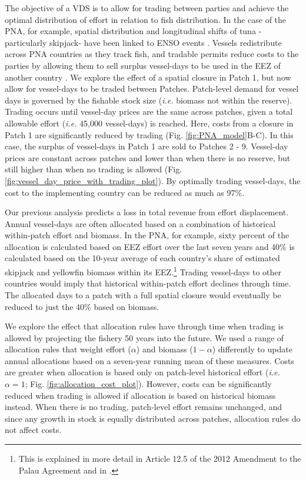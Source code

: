 \documentclass[12pt]{article}
\begin{document}
The objective of a VDS is to allow for trading between parties and achieve the optimal distribution of effort in relation to fish distribution. In the case of the PNA, for example, spatial distribution and longitudinal shifts of tuna -particularly skipjack- have been linked to ENSO events \cite{lehodey_1997}. Vessels redistribute across PNA countries as they track fish, and tradable permits reduce costs to the parties by allowing them to sell surplus vessel-days to be used in the EEZ of another country \cite{aqorau_2018}. We explore the effect of a spatial closure in Patch 1, but now allow for vessel-days to be traded between Patches. Patch-level demand for vessel days is governed by the fishable stock size (\emph{i.e.} biomass not within the reserve). Trading occurs until vessel-day prices are the same across patches, given a total allowable effort (\emph{i.e.} 45,000 vessel-days) is reached. Here, costs from a closure in Patch 1 are significantly reduced by trading (Fig. \ref{fig:PNA_model}B-C). In this case, the surplus of vessel-days in Patch 1 are sold to Patches 2 - 9. Vessel-day prices are constant across patches and lower than when there is no reserve, but still higher than when no trading is allowed (Fig. \ref{fig:vessel_day_price_with_trading_plot}). By optimally trading vessel-days, the cost to the implementing country can be reduced as much as 97\%.

Our previous analysis predicts a loss in total revenue from effort displacement. Annual vessel-days are often allocated based on a combination of historical within-patch effort and biomass. In the PNA, for example, sixty percent of the allocation is calculated based on EEZ effort over the last seven years and 40\% is calculated based on the 10-year average of each country’s share of estimated skipjack and yellowfin biomass within its EEZ.\footnote{This is explained in more detail in Article 12.5 of the 2012 Amendment to the Palau Agreement and in \cite{Hagrannsoknir2014}.} Trading vessel-days to other countries would imply that historical within-patch effort declines through time. The allocated days to a patch with a full spatial closure would eventually be reduced to just the 40\% based on biomass.

We explore the effect that allocation rules have through time when trading is allowed by projecting the fishery 50 years into the future. We used a range of allocation rules that weight effort ($\alpha$) and biomass ($1 - \alpha$) differently to update annual allocations based on a seven-year running mean of these measures. Costs are greater when allocation is based only on patch-level historical effort (\emph{i.e.} $\alpha = 1$; Fig. \ref{fig:allocation_cost_plot}). However, costs can be significantly reduced when trading is allowed if allocation is based on historical biomass instead. When there is no trading, patch-level effort remains unchanged, and since any growth in stock is equally distributed across patches, allocation rules do not affect costs.
\end{document}
